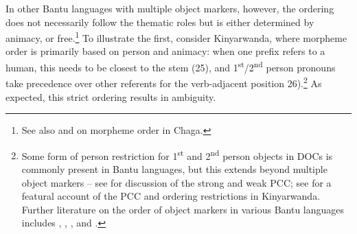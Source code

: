 \documentclass[output=paper
,modfonts
,nonflat]{langsci/langscibook}
\begin{document}
In other Bantu languages with multiple object markers, however, the ordering does not necessarily follow the thematic roles but is either determined by animacy, or free.\footnote{See also \citet{Bresnan_Moshi1990} and \citet{Alsina1996} on morpheme order in Chaga.} To illustrate the first, consider Kinyarwanda, where morpheme order is primarily based on person and animacy: when one prefix refers to a human, this needs to be closest to the stem (25), and 1\textsuperscript{st}/2\textsuperscript{nd} person pronouns take precedence over other referents for the verb-adjacent position 26).\footnote{Some form of person restriction for 1\textsuperscript{st} and 2\textsuperscript{nd} person objects in DOCs is commonly present in Bantu languages, but this extends beyond multiple object markers – see \citet{Riedel2009} for discussion of the strong and weak PCC; see \citet{Yokoyama2016} for a featural account of the PCC and ordering restrictions in Kinyarwanda. Further literature on the order of object markers in various Bantu languages includes \citet{Duranti1979}, \citet{Bresnan_Moshi1990}, \citet{Rugemalira1993}, and \citet{Alsina1996}.} As expected, this strict ordering results in ambiguity.
\end{document}
